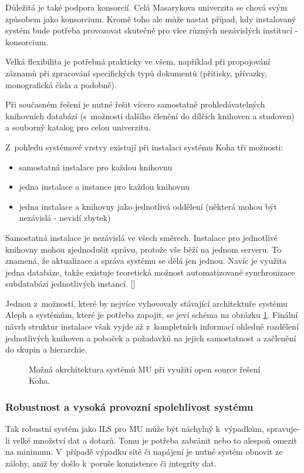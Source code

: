 \documentclass[
	11pt, oneside, printed, final, palatino, monochrome
	microtype,
	table,   %
	lof,     %
	lot     %
]{fithesis3}
\newcommand{\citepages}[2]{[\cite[#1]{#2}]}
\begin{document}
{Důležitá je také podpora konsorcií. Celá Masarykova univerzita se chová svým způsobem jako konsorcium. Kromě toho ale může nastat případ, kdy instalovaný systém bude potřeba provozovat skutečně pro více různých nezávislých institucí - konsorcium.

Velká flexibilita je potřebná prakticky ve všem, například při propojování záznamů při zpracování specifických typů dokumentů (přítisky, přívazky, monografická čísla a podobně).

Při současném řešení je nutné řešit vícero samostatně prohledávatelných knihovních databází (s~možností dalšího členění do dílčích knihoven a studoven) a souborný katalog pro celou univerzitu.

Z~pohledu systémové vrstvy existují při instalaci systému Koha tři možnosti:

\begin{itemize}
\item samostatná instalace pro každou knihovnu
\item jedna instalace a instance pro každou knihovnu
\item jedna instalace a knihovny jako jednotlivá oddělení (některá mohou být nezávislá - nevidí zbytek)
\end{itemize}

Samostatná instalace je nezávislá ve všech směrech.
Instalace pro jednotlivé knihovny mohou zjednodušit správu, protože vše běží na jednom serveru. To znamená, že aktualizace a správa systému se dělá jen jednou. Navíc je využita jedna databáze, takže existuje teoretická možnost automatizované synchronizace subdatabází jednotlivých instancí. \citepages{19-21}{breeding_2012}

Jednou z~možností, které by nejvíce vyhovovaly stávající architektuře systému Aleph a systémům, které je potřeba zapojit, se jeví schéma na obrázku \ref{fig:koha}. Finální návrh struktur instalace však vyjde až z~kompletních informací ohledně rozdělení jednotlivých knihoven a poboček a požadavků na jejich samostatnost a začlenění do skupin a hierarchie.

\begin{figure}
    \centering
	\def\svgwidth{1.27\textwidth}
    
	\caption{Možná akrchitektura systémů MU při využití open source řešení Koha.}
	\label{fig:koha}
\end{figure}

\subsubsection{Robustnost a vysoká provozní spolehlivost systému}
Tak robustní systém jako ILS pro MU může být náchylný k~výpadkům, spravuje-li velké množství dat a dotazů. Tomu je potřeba zabránit nebo to alespoň omezit na minimum. V~případě výpadku sítě či napájení je nutné systém obnovit ze zálohy, aniž by došlo k~poruše konzistence či integrity dat.

}
\end{document}

